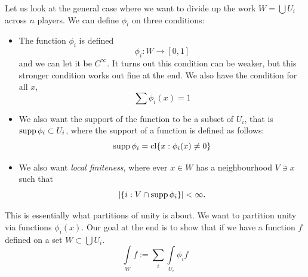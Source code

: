 \documentclass{article}
\begin{document}
Let us look at the general case where we want to divide up the work $W= \bigcup U_i$ across $n$ players. We can define $\phi_i$ on three conditions:
\begin{itemize}
    \item The function $\phi_i$ is defined 
    \begin{equation}
        \phi_i: W \rightarrow [0,1]
    \end{equation}
    and we can let it be $C^\infty$. It turns out this condition can be weaker, but this stronger condition works out fine at the end. We also have the condition for all $x$,
    \begin{equation}
        \sum \phi_i(x) = 1
    \end{equation}
    \item We also want the support of the function to be a subset of $U_i$, that is $\operatorname{supp} \phi_i \subset U_i$, where the support of a function is defined as follows:
    \begin{equation}
        \operatorname{supp} \phi_i = \operatorname{cl} \{x:\phi_i(x) \neq 0\}
    \end{equation}
    \item We also want \textit{local finiteness}, where ever $x\in W$ has a neighbourhood $V \ni x$ such that 
    \begin{equation}
        \left|\{i: V \cap \operatorname{supp} \phi_i \} \right| < \infty.
    \end{equation}
\end{itemize}
This is essentially what partitions of unity is about. We want to partition unity via functions $\phi_i(x).$ Our goal at the end is to show that if we have a function $f$ defined on a set $W \subset \bigcup U_i.$ 
\begin{equation}
    \int\limits_W f := \sum_i \int\limits_{U_i}\phi_i f
\end{equation}
\end{document}
